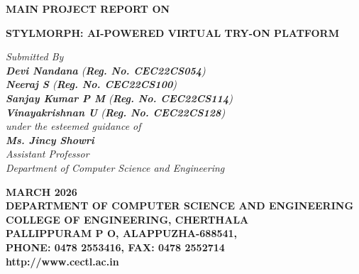 \documentclass[12pt,a4paper,oneside]{report}
\begin{document}
\thispagestyle{fancy}
\pagestyle{fancy}

\begin{titlepage}
\begin{center}
\Large{\textbf{MAIN PROJECT REPORT ON}}

\begin{singlespace}
\LARGE{\textbf{STYLMORPH: AI-POWERED VIRTUAL TRY-ON PLATFORM}}\\
\end{singlespace}
\Large{\textit{Submitted By }}\\
\large{\textit{\textbf{Devi Nandana}
(\textbf{Reg. No. CEC22CS054})}}\\
\large{\textit{\textbf{Neeraj S}
(\textbf{Reg. No. CEC22CS100})}}\\
\large{\textit{\textbf{Sanjay Kumar P M}
(\textbf{Reg. No. CEC22CS114})}}\\
\large{\textit{\textbf{Vinayakrishnan U}
(\textbf{Reg. No. CEC22CS128})}}\\

\large{\textit{under the esteemed guidance of}}\\
\large{\textit{\textbf{Ms. Jincy Showri} }}\\
\large{\textit{Assistant Professor}}\\
\large{\textit{Department of Computer Science and Engineering}}
\\
\begin{figure}[h]
\begin{center}
\end{center}
\end{figure}
\begin{singlespace}
\large{\textbf{MARCH 2026}}\\

\large{\textbf{DEPARTMENT OF COMPUTER SCIENCE AND ENGINEERING\\COLLEGE OF ENGINEERING, CHERTHALA\\ PALLIPPURAM P O, ALAPPUZHA-688541, \\PHONE: 0478 2553416, FAX: 0478 2552714\\http://www.cectl.ac.in}}
\end{singlespace}
\end{center}
\end{titlepage}
\end{document}
